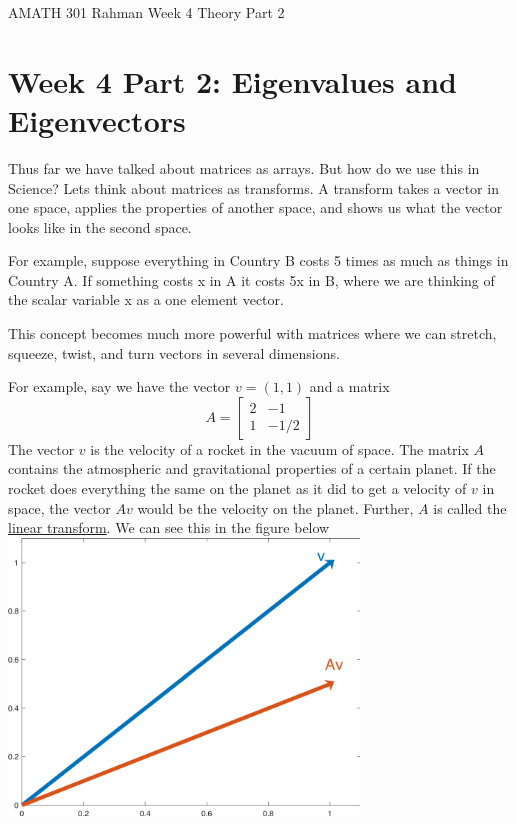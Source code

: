 \documentclass[reqno]{amsart}
\theoremstyle{definition}
\begin{document}
\begin{flushleft}
{\sc \Large AMATH 301 Rahman} \hfill Week 4 Theory Part 2
\bigskip
\end{flushleft}

\newcommand{\R}{\mathbb{R}}
\newcommand{\N}{\mathbb{N}}
\newcommand{\Z}{\mathbb{Z}}
\newcommand{\Q}{\mathbb{Q}}
\renewcommand{\CancelColor}{\color{red}}
\newcommand{\?}{\stackrel{?}{=}}
\renewcommand{\varphi}{\phi}
\newcommand{\card}{\text{Card}}
\newcommand{\bigzero}{\text{\Huge 0}}
\newcommand{\curvearrowdown}{{\color{red}\rotatebox{90}{$\curvearrowleft$}}}
\newcommand{\curvearrowup}{{\color{red}\rotatebox{90}{$\curvearrowright$}}}



\section*{Week 4 Part 2:  Eigenvalues and Eigenvectors}

Thus far we have talked about matrices as arrays.  But how do we use this in Science?  Lets think about matrices as transforms.  A transform takes a vector in one space, applies the properties of another space, and shows us what the vector looks like in the second space.

For example, suppose everything in Country B costs 5 times as much as things in Country A.  If something costs x in A it costs 5x in B, where we are thinking of the scalar variable x as a one element vector.

This concept becomes much more powerful with matrices where we can stretch, squeeze, twist, and turn vectors in several dimensions.

For example, say we have the vector $v = (1, 1)$ and a matrix
%
\begin{equation*}
A = \begin{bmatrix}
2 & -1\\
1 & -1/2
\end{bmatrix}
\end{equation*}
%
The vector $v$ is the velocity of a rocket in the vacuum of space.  The matrix $A$ contains the atmospheric and gravitational properties of a certain planet.  If the rocket does everything the same on the planet as it did to get a velocity of $v$ in space, the vector $Av$ would be the velocity on the planet.  Further, $A$ is called the {\color{red}\underline{linear transform}}.  We can see this in the figure below
%
\includegraphics[width = 0.7\textwidth]{Transform}
\end{document}
